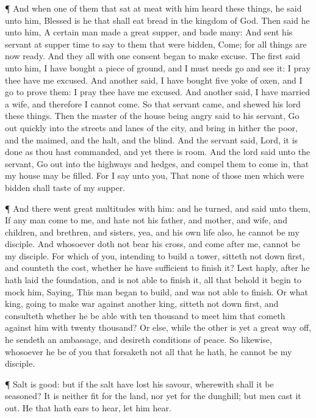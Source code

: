  ¶ And when one of them that sat at meat with him heard
these things, he said unto him, Blessed is he that shall eat bread in
the kingdom of God.  Then said he unto him, A certain man
made a great supper, and bade many:  And sent his servant
at supper time to say to them that were bidden, Come; for all things are
now ready.  And they all with one consent began to make
excuse. The first said unto him, I have bought a piece of ground, and I
must needs go and see it: I pray thee have me excused.  And
another said, I have bought five yoke of oxen, and I go to prove them: I
pray thee have me excused.  And another said, I have
married a wife, and therefore I cannot come.  So that
servant came, and shewed his lord these things. Then the master of the
house being angry said to his servant, Go out quickly into the streets
and lanes of the city, and bring in hither the poor, and the maimed, and
the halt, and the blind.  And the servant said, Lord, it is
done as thou hast commanded, and yet there is room.  And
the lord said unto the servant, Go out into the highways and hedges, and
compel them to come in, that my house may be filled.  For I
say unto you, That none of those men which were bidden shall taste of my
supper.

 ¶ And there went great multitudes with him: and he turned,
and said unto them,  If any man come to me, and hate not
his father, and mother, and wife, and children, and brethren, and
sisters, yea, and his own life also, he cannot be my disciple.
 And whosoever doth not bear his cross, and come after me,
cannot be my disciple.  For which of you, intending to
build a tower, sitteth not down first, and counteth the cost, whether he
have sufficient to finish it?  Lest haply, after he hath
laid the foundation, and is not able to finish it, all that behold it
begin to mock him,  Saying, This man began to build, and
was not able to finish.  Or what king, going to make war
against another king, sitteth not down first, and consulteth whether he
be able with ten thousand to meet him that cometh against him with
twenty thousand?  Or else, while the other is yet a great
way off, he sendeth an ambassage, and desireth conditions of peace.
 So likewise, whosoever he be of you that forsaketh not all
that he hath, he cannot be my disciple.

 ¶ Salt is good: but if the salt have lost his savour,
wherewith shall it be seasoned?  It is neither fit for the
land, nor yet for the dunghill; but men cast it out. He that hath ears
to hear, let him hear.

